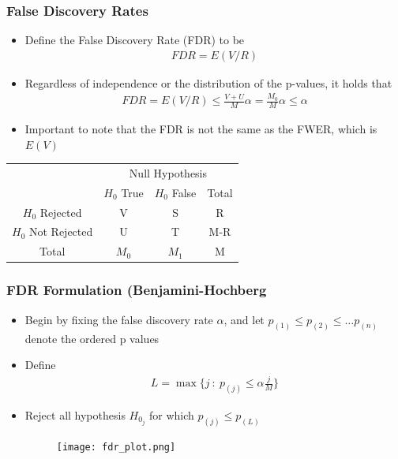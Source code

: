 \documentclass[11pt]{beamer}
\begin{document}
\begin{frame}
\frametitle{False Discovery Rates}
{
\begin{itemize}
\item Define the False Discovery Rate (FDR) to be 
\begin{align*}
FDR = E(V/R)
\end{align*}
\item Regardless of independence or the distribution of the p-values, it holds that
\begin{align*}
FDR = E(V/R) \leq \frac{V+U}{M} \alpha = \frac{M_0}{M} \alpha \leq \alpha
\end{align*}
\item Important to note that the FDR is not the same as the FWER, which is $E(V)$
\end{itemize}
\begin{center}
\begin{tabular}{c| c c c}
\hline
& \multicolumn{3}{c}{Null Hypothesis} \\[3pt]
& $H_0$ True & $H_0$ False & Total\\
\hline 
$H_0$ Rejected & V & S & R \\[2pt]
$H_0$ Not Rejected & U & T  & M-R \\[1pt]
\hline
Total & $M_0$& $M_1$& M\\
\hline
\end{tabular}
\end{center}
}
\end{frame}

\begin{frame}
\frametitle{FDR Formulation (Benjamini-Hochberg}
{
\begin{itemize}
\item Begin by fixing the false discovery rate $\alpha$, and let $p_{(1)} \leq p_{(2)} \leq \dots p_{(n)}$ denote the ordered p values \\
\item Define
\begin{align*}
L = \max \bigg\{j \ : \ p_{(j)} \leq \alpha \frac{j}{M} \bigg\}
\end{align*}
\item Reject all hypothesis $H_{0_j}$ for which $p_{(j)} \leq p_{(L)}$

\begin{figure}
\texttt{[image: fdr\_plot.png]} 
\end{figure}
\end{itemize}
}
\end{frame}
\end{document}
